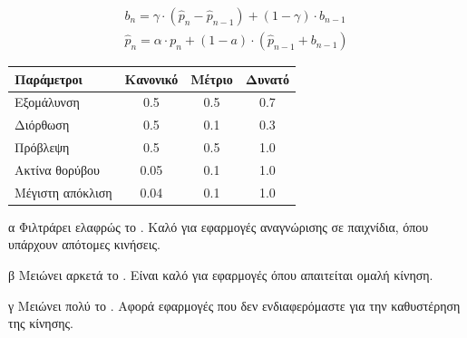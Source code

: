 \begin{equation}
    \begin{aligned}
        b_{n} = \gamma \cdot (\hat{p}_{n} - \hat{p}_{n-1}) + (1 - \gamma) \cdot b_{n-1}\\[10pt]
        \hat{p}_{n} = \alpha \cdot p_{n} + (1 - a) \cdot (\hat{p}_{n-1} + b_{n-1})
    \end{aligned}
    \label{equ:double-exponential}
\end{equation}

\vspace{10pt}

\begin{center}
    \begin{threeparttable}
        \begin{tabular}{lccc}
            \toprule
            Παράμετροι & Κανονικό\tnote{α} & Μέτριο\tnote{β} & Δυνατό\tnote{γ} \\
            \midrule
            Εξομάλυνση & 0.5 & 0.5 & 0.7 \\
            Διόρθωση & 0.5 & 0.1 & 0.3 \\
            Πρόβλεψη & 0.5 & 0.5 & 1.0 \\
            Ακτίνα θορύβου & 0.05 & 0.1 & 1.0 \\
            Μέγιστη απόκλιση & 0.04 & 0.1 & 1.0 \\
            \bottomrule
        \end{tabular}
        \begin{tablenotes}
            \item[α] Φιλτράρει ελαφρώς το . Καλό για εφαρμογές αναγνώρισης σε παιχνίδια, όπου υπάρχουν απότομες κινήσεις.
            \item[β] Μειώνει αρκετά το . Είναι καλό για εφαρμογές όπου απαιτείται ομαλή κίνηση.
            \item[γ] Μειώνει πολύ το . Αφορά εφαρμογές που δεν ενδιαφερόμαστε για την καθυστέρηση της κίνησης.
        \end{tablenotes}
    \end{threeparttable}
    \label{tab:filter-parameters}
\end{center}


